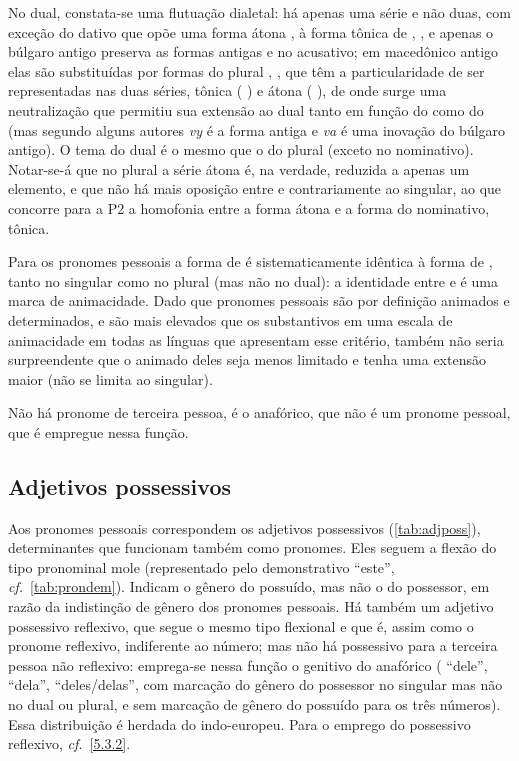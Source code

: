 No dual, constata-se uma flutuação dialetal: há apenas uma série e não
duas, com exceção do dativo que opõe uma forma átona ,
 à forma tônica de  ,
,
e apenas o búlgaro antigo preserva as formas antigas  e
 no acusativo; em macedônico antigo elas são substituídas
por formas do plural , , que têm a
particularidade de ser representadas nas duas séries, tônica (
) e átona ( ), de onde surge uma
neutralização que permitiu sua extensão ao dual tanto em função do 
como do  (mas segundo alguns autores \emph{vy} é a forma antiga e
\emph{va} é uma inovação do búlgaro antigo). O tema do dual é o mesmo
que o do plural (exceto no nominativo). Notar-se-á que no plural a série
átona é, na verdade, reduzida a apenas um elemento, e que não há mais
oposição entre  e  contrariamente ao singular, ao que concorre
para a P2 a homofonia entre a forma átona e a forma do nominativo,
tônica.

Para os pronomes pessoais a forma de  é sistematicamente idêntica à
forma de , tanto no singular como no plural (mas não no dual): a
identidade entre  e  é uma marca de animacidade. Dado que
pronomes pessoais são por definição animados e determinados, e são mais
elevados que os substantivos em uma escala de animacidade em todas as
línguas que apresentam esse critério, também não seria surpreendente que
o  animado deles seja menos limitado e tenha uma extensão maior
(não se limita ao singular).

Não há pronome de terceira pessoa, é o anafórico, que não é um pronome
pessoal, que é empregue nessa função.

\subsection{Adjetivos possessivos}

Aos pronomes pessoais correspondem os adjetivos possessivos (\autoref{tab:adjposs}),
determinantes que funcionam também como pronomes. Eles seguem a flexão
do tipo pronominal mole (representado pelo demonstrativo 
``este'', \emph{cf.}~\autoref{tab:prondem}). Indicam o gênero do possuído, mas não o do
possessor, em razão da indistinção de gênero dos pronomes pessoais. Há
também um adjetivo possessivo reflexivo, que segue o mesmo tipo
flexional e que é, assim como o pronome reflexivo, indiferente ao
número; mas não há possessivo para a terceira pessoa não reflexivo:
emprega-se nessa função o genitivo do anafórico (
``dele'',  ``dela'',  ``deles/delas'', com
marcação do gênero do possessor no singular mas não no dual ou plural, e
sem marcação de gênero do possuído para os três números). Essa
distribuição é herdada do indo-europeu. Para o emprego do possessivo
reflexivo, \emph{cf.}~\ref{5.3.2}.

